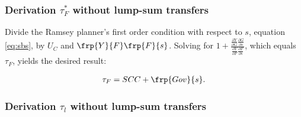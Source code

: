 \subsubsection{Derivation $\tau_F^*$ without lump-sum transfers}\label{app:reiv_tauf}
	
Divide the Ramsey planner's first order condition with respect to $s$, equation \ref{eq:sbs}, by $U_C$ and $\frp{Y}{F}\frp{F}{s}$. Solving for $1+\frac{\frac{\partial Y}{\partial G}\frac{\partial G}{\partial s}}{\frac{\partial Y}{\partial F}\frac{\partial F}{\partial s}}$, which equals $\tau_F$, yields the desired result:

\begin{align}
\tau_{F}=SCC + \frp{Gov}{s}.
\end{align}

\begin{comment}
The latter summand can be rewritten to 
\begin{align}
\frp{Gov}{s}= \frp{Y}{s}+H^2 \frp{\left(\frp{Y}{L_G}\right)}{L_G}.
\end{align}
Where under decreasing returns to scale the second summand is negative and the first is positive. \textit{To be continued.} 

content...
\end{comment}
\subsubsection{Derivation $\tau_l$ without lump-sum transfers }\label{app:subsub_nltaul}

